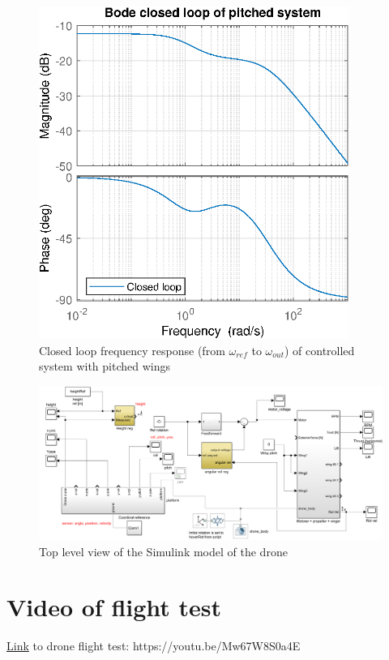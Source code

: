 \begin{figure}[h]
    \centering
    \includegraphics[width=0.9\textwidth]{figures/appendix/bode_closed_loop_pitch.eps}
    \caption{Closed loop frequency response (from $\omega_{ref}$ to $\omega_{out}$) of controlled system with pitched wings}
    \label{fig:systempitchcontrollerbode}
\end{figure}

\begin{figure}
    \centering
    \includegraphics[width=1\textwidth]{figures/system_modelling/top_level_block_diagram.PNG}
    \caption{Top level view of the Simulink model of the drone}
    \label{fig:toplevelmodel}
\end{figure}



\chapter{Video of flight test}
\href{https://youtu.be/Mw67W8S0a4E}{Link} to drone flight test: https://youtu.be/Mw67W8S0a4E\label{link:droneflight}


